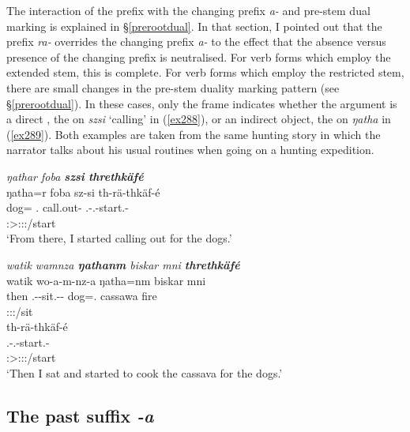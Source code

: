 The interaction of the  prefix with the  changing prefix \emph{a-} and pre-stem dual marking is explained in \S{}\ref{prerootdual}. In that section, I pointed out that the  prefix \emph{ra-} overrides the  changing prefix \emph{a-} to the effect that the absence versus presence of the  changing prefix is neutralised. For verb forms which employ the extended stem, this  is complete. For verb forms which employ the restricted stem, there are small changes in the pre-stem duality marking pattern (see \S{}\ref{prerootdual}).  In these cases, only the  frame indicates whether the  argument is a direct , the \Abs{}  on \emph{szsi} `calling' in (\ref{ex288}), or an indirect object, the \Dat{}  on \emph{ŋatha} in (\ref{ex289}). Both examples are taken from the same hunting story in which the narrator talks about his usual routines when going on a hunting expedition.

\begin{exe}
	\ex \emph{ŋathar foba \textbf{szsi} \textbf{threthkäfé}}\\
	\glll ŋatha=r foba sz-si th-rä-thkäf-é\\
	dog=\Purp{} \Dist.\Abl{} call.out-\Nmlz{} \Stnsg.\Bet-\Irr.\Ndu-start.\Rs-\Fsg\\
	{} {} {} \footnotesize{\Fsg:\Sbj>\Stpl:\Obj:\Irr:\Pfv/start}\\
	\trans `From there, I started calling out for the dogs.'
	\label{ex288}
\end{exe}
\begin{exe}
	\ex \emph{watik wamnza \textbf{ŋathanm} biskar mni \textbf{threthkäfé}}\\
	\glll watik wo-a-m-nz-a ŋatha=nm biskar mni\\
	then \Fsg.\Alph-\Vc-sit.\Ext-\Ndu-\Pst{} dog=\Dat.\Nsg{} cassawa fire\\
	{} \footnotesize{\Fsg:\Sbj:\Pst:\Ipfv/sit} {} {} {}\\
	\sn
	\glll th-rä-thkäf-é\\
	\Stnsg.\Bet-\Irr.\Ndu-start.\Rs-\Fsg\\
	\footnotesize{\Fsg:\Sbj>\Stpl:\Obj:\Irr:\Pfv/start}\\
	\trans `Then I sat and started to cook the cassava for the dogs.'
	\label{ex289}
\end{exe}

\subsection{The past suffix \emph{-a}} \label{pastsuffixa}


